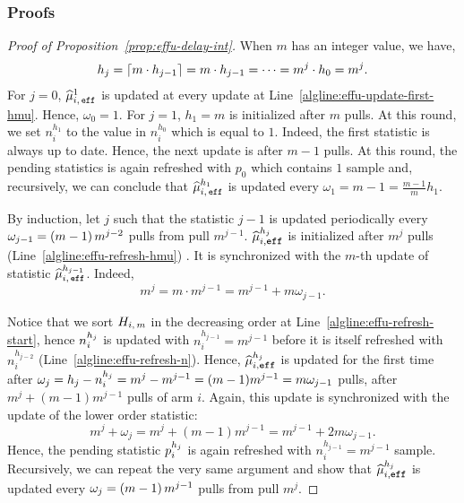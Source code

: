 \subsubsection{Proofs}
\begin{proof}[Proof of Proposition~\ref{prop:effu-delay-int}]
When $m$ has an integer value, we have, 
\[
h_j = \left\lceil m \cdot h_{j-1}\right\rceil = m \cdot h_{j-1} = \dots = m^j\cdot h_0 = m^j.
\]
For $j=0$, $\widehat{\mu}_{i,\,\normalfont{\texttt{eff}}}^1$ is updated at every update at Line~\ref{algline:effu-update-first-hmu}. Hence, $\omega_0 =1$. 
For $j=1$, $h_1 =m$ is initialized after $m$ pulls. At this round, we set $n_i^{h_1}$ to the value in $n_i^{h_0}$ which is equal to $1$. Indeed, the first statistic is always up to date. Hence, the next update is after $m-1$ pulls. At this round, the pending statistics is again refreshed with $p_0$ which contains $1$ sample and, recursively, we can conclude that  $\widehat{\mu}_{i,\,\normalfont{\texttt{eff}}}^{h_1}$ is updated every $\omega_1 = m-1 =   \frac{m-1}{m} h_1$.

By induction, let $j$ such that the statistic $j-1$ is updated periodically every $\omega_{j-1} = \left(m-1\right) m^{j-2}$ pulls from pull $m^{j-1}$. $\widehat{\mu}_{i,\texttt{\footnotesize{eff}}}^{h_j}$ is initialized after $m^j$ pulls (Line~\ref{algline:effu-refresh-hmu}) . It is synchronized with the $m$-th update of statistic $\widehat{\mu}_{i,\,\normalfont{\texttt{eff}}}^{h_{j-1}}$. Indeed,
\[ m^j = m \cdot m^{j-1} =  m^{j-1} + m \omega_{j-1}.\]

Notice that we sort $H_{i,\,m}$ in the decreasing order at Line~\ref{algline:effu-refresh-start}, hence $n_i^{h_j}$ is updated with $n_i^{h_{j-1}} = m^{j-1}$ before it is itself refreshed with $n_i^{h_{j-2}}$  (Line~\ref{algline:effu-refresh-n}).  Hence, $\widehat{\mu}_{i,\texttt{\footnotesize{eff}}}^{h_j}$ is updated for the first time after $\omega_j =h_{j} - n_i^{h_j} =  m^j - m^{j-1} = (m-1) m^{j-1} = m \omega_{j-1}$ pulls, \ie after $m^{j} + (m-1) m^{j-1}$ pulls of arm $i$. Again, this update is synchronized with the update of the lower order statistic:
\[ m^j +\omega_j =  m^{j} + (m-1) m^{j-1} =  m^{j-1} + 2m \omega_{j-1}.\]
Hence, the pending statistic $p_i^{h_j}$ is again refreshed with $n_i^{h_{j-1}} = m^{j-1}$ sample. Recursively, we can repeat the very same argument and show that $\widehat{\mu}_{i,\texttt{\footnotesize{eff}}}^{h_j}$ is updated every $\omega_j = \left(m-1\right) m^{j-1}$ pulls from pull $m^{j}$.
\end{proof}

